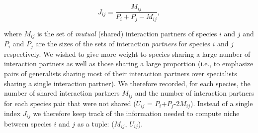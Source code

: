 \documentclass[12pt]{article}
\begin{document}
\begin{spacing}{1.5}
  \begin{equation}
    J_{ij} = \frac{M_{ij}}{P_i+P_j-M_{ij}} ,
  \end{equation}

  where $M_{ij}$ is the set of \emph{mutual} (shared) interaction partners of 
  species $i$ and $j$ and $P_i$ and $P_j$ are the sizes of the sets of interaction 
  \emph{partners} for species $i$ and $j$ respectively. We wished to give more 
  weight to species sharing a large number of interaction partners as well as 
  those sharing a large proportion (i.e., to emphasize pairs of generalists 
  sharing most of their interaction partners over specialists sharing a single 
  interaction partner). We therefore recorded, for each species, the number of 
  shared interaction partners $M_{ij}$ and the number of interaction partners 
  for each species pair that were not shared 
  ($U_{ij}$ = $P_{i}$+$P_{j}$-2$M_{ij}$). Instead of a single index $J_{ij}$ 
  we therefore keep track of the information needed to compute
  niche between species $i$ and $j$ as a tuple: ($M_{ij}$, $U_{ij}$).






\end{spacing}
\end{document}
